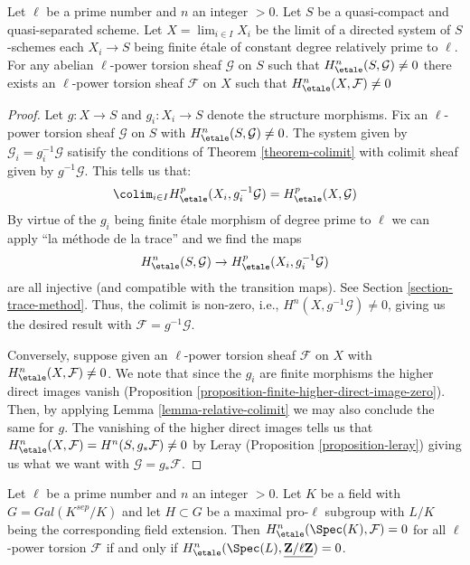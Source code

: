 \begin{lemma}
\label{lemma-nonvanishing-inherited}
Let $\ell$ be a prime number and $n$ an integer $> 0$.
Let $S$ be a quasi-compact and quasi-separated scheme.
Let $X = \lim_{i \in I}{X_i}$ be the limit of a
directed system of $S$-schemes each $X_i \to S$
being finite \'etale of constant degree relatively prime to $\ell$.
For any abelian $\ell$-power torsion sheaf $\mathcal{G}$ on $S$
such that $H_\etale^n(S, \mathcal{G}) \neq 0$
there exists an $\ell$-power torsion sheaf $\mathcal{F}$ on $X$
such that $H_\etale^n(X, \mathcal{F}) \neq 0$
\end{lemma}

\begin{proof}
Let $g : X \to S$ and $g_i : X_i \to S$ denote the structure morphisms.
Fix an $\ell$-power torsion sheaf $\mathcal{G}$ on $S$
with $H^n_\etale(S, \mathcal{G}) \not = 0$.
The system given by $\mathcal{G}_i = g_i^{-1}\mathcal{G}$
satisify the conditions of Theorem \ref{theorem-colimit}
with colimit sheaf given by $g^{-1}\mathcal{G}$. This tells 
us that:
$$
\colim_{i\in I} H^p_\etale(X_i, g_i^{-1}\mathcal{G}) = 
H^p_\etale(X, \mathcal{G})
$$
By virtue of the $g_i$ being finite \'etale morphism of degree prime
to $\ell$ we can apply ``la m\'ethode de la trace'' and we find
the maps
$$
H^n_\etale(S, \mathcal{G}) \to H^p_\etale(X_i, g_i^{-1}\mathcal{G})
$$
are all injective (and compatible with the transition maps).
See Section \ref{section-trace-method}. Thus, the colimit is non-zero, i.e.,
$H^n(X,g^{-1}\mathcal{G}) \neq 0$, giving us the desired result with 
$\mathcal{F} = g^{-1}\mathcal{G}$.

\medskip\noindent
Conversely, suppose given an $\ell$-power torsion sheaf $\mathcal{F}$ on $X$
with $H^n_\etale(X, \mathcal{F}) \not = 0$. We note that since the $g_i$
are finite morphisms the higher direct images vanish
(Proposition \ref{proposition-finite-higher-direct-image-zero}).
Then, by applying Lemma \ref{lemma-relative-colimit}
we may also conclude the  same for $g$.
The vanishing of the higher direct images tells us that
$H^n_\etale(X, \mathcal{F}) = H^n(S, g_*\mathcal{F}) \neq 0$
by Leray (Proposition \ref{proposition-leray})
giving us what we want with $\mathcal{G} = g_*\mathcal{F}$.
\end{proof}

\begin{lemma}
\label{lemma-reduce-to-l-group}
Let $\ell$ be a prime number and $n$ an integer $> 0$.
Let $K$ be a field with $G = Gal(K^{sep}/K)$ and let
$H \subset G$ be a maximal pro-$\ell$ subgroup with $L/K$
being the corresponding field extension. Then
$H^n_\etale(\Spec(K), \mathcal{F}) = 0$ for all
$\ell$-power torsion $\mathcal{F}$ if and only if
$H^n_\etale(\Spec(L), \underline{\mathbf{Z}/\ell\mathbf{Z}}) = 0$.
\end{lemma}

